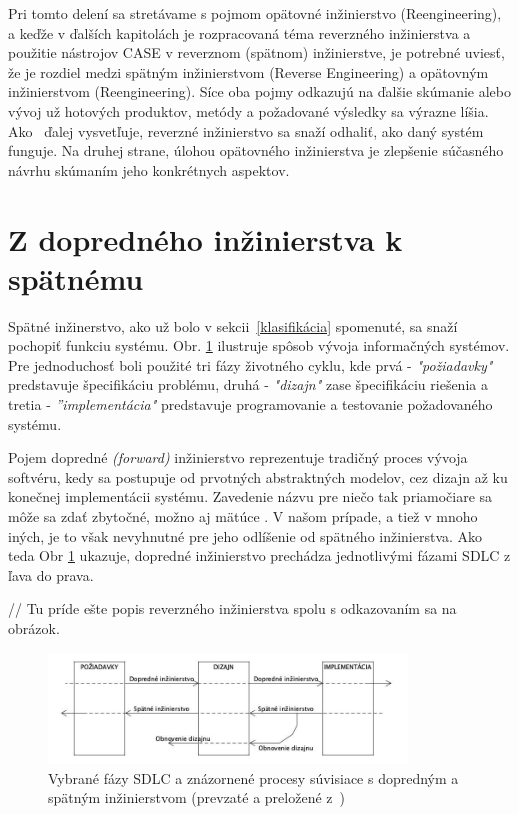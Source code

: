 \documentclass[10pt,twoside,slovak,a4paper]{article}
\begin{document}
Pri tomto delení sa stretávame s pojmom opätovné inžinierstvo (Reengineering), a keďže v ďalších kapitolách je rozpracovaná téma reverzného inžinierstva a použitie nástrojov CASE v reverznom (spätnom) inžinierstve, je potrebné uviesť, že je rozdiel medzi spätným inžinierstvom (Reverse Engineering) a opätovným inžinierstvom (Reengineering). Síce oba pojmy odkazujú na ďalšie skúmanie alebo vývoj už hotových produktov, metódy a požadované výsledky sa výrazne líšia.  Ako~\cite{reengineering} ďalej vysvetľuje, reverzné inžinierstvo sa snaží odhaliť, ako daný systém funguje. Na druhej strane, úlohou opätovného inžinierstva je zlepšenie súčasného návrhu skúmaním jeho konkrétnych aspektov. 


\section{Z dopredného inžinierstva k spätnému}\label{forward vs reverse}


Spätné inžinerstvo, ako už bolo v sekcii~\ref{klasifikácia} spomenuté, sa snaží pochopiť funkciu systému. Obr. \ref{obr_forward_reverse} ilustruje spôsob vývoja informačných systémov. Pre jednoduchosť boli použité tri fázy životného cyklu, kde prvá -  \emph{"požiadavky"} predstavuje špecifikáciu problému, druhá  - \emph{"dizajn"} zase špecifikáciu riešenia a tretia -  \emph{''implementácia"} predstavuje programovanie a testovanie požadovaného systému.

Pojem dopredné \textit{(forward)} inžinierstvo reprezentuje tradičný proces vývoja softvéru, kedy sa postupuje od prvotných abstraktných modelov, cez dizajn až ku konečnej implementácii systému. Zavedenie názvu pre niečo tak priamočiare sa môže sa zdať zbytočné, možno aj mätúce . V našom prípade, a tiež v mnoho iných, je to však nevyhnutné pre jeho odlíšenie od spätného inžinierstva. Ako teda Obr \ref{obr_forward_reverse} ukazuje, dopredné inžinierstvo prechádza jednotlivými fázami SDLC z ľava do prava.

// Tu príde ešte popis reverzného inžinierstva spolu s odkazovaním sa na obrázok.

\begin{figure}[tbh]
\centering
\includegraphics[width=0.85\textwidth]{forward_reverse.jpg}
\caption{Vybrané fázy SDLC a znázornené procesy súvisiace s dopredným a spätným inžinierstvom (prevzaté a preložené z~\cite{2010})}
\label{obr_forward_reverse}
\end{figure}
\end{document}
